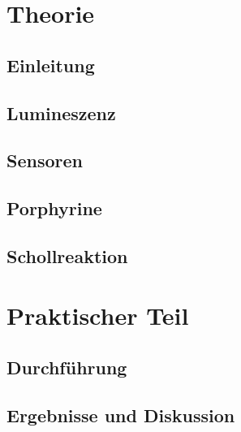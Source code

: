 \cleardoublepage
{}


\tableofcontents                %

\listoffigures


\mainmatter                     %
\part{Theorie}
\chapter{Einleitung}

\chapter{Lumineszenz}

\chapter{Sensoren}

\chapter{Porphyrine}

\chapter{Schollreaktion}

\part{Praktischer Teil}
\chapter{Durchführung}

\chapter{Ergebnisse und Diskussion}

